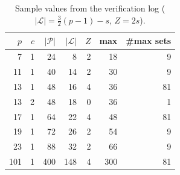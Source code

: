 \documentclass[11pt]{article}
\theoremstyle{remark}
\newcommand{\Lc}{\mathcal{L}}
\newcommand{\Pset}{\mathcal{P}}
\begin{document}
\begin{table}[ht]\centering\small
\begin{tabular}{rrrrrrr}
\toprule
$p$ & $c$ & $|\Pset|$ & $|\Lc|$ & $Z$ & max & \#max sets\\
\midrule
7 & 1 & 24 & 8 & 2 & 18 & 9\\
11 & 1 & 40 & 14 & 2 & 30 & 9\\
13 & 1 & 48 & 16 & 4 & 36 & 81\\
13 & 2 & 48 & 18 & 0 & 36 & 1\\
17 & 1 & 64 & 22 & 4 & 48 & 81\\
19 & 1 & 72 & 26 & 2 & 54 & 9\\
23 & 1 & 88 & 32 & 2 & 66 & 9\\
101 & 1 & 400 & 148 & 4 & 300 & 81\\
\bottomrule
\end{tabular}
\caption{Sample values from the verification log ($|\Lc|=\tfrac32(p-1)-s$, $Z=2s$).}
\end{table}
\end{document}

